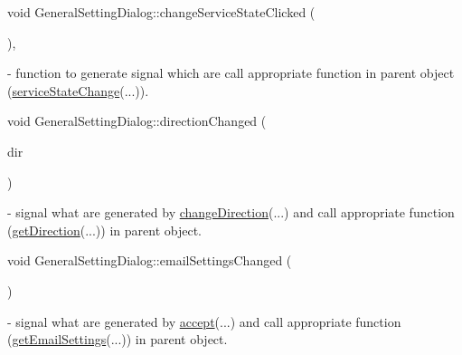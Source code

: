 \mbox{\label{classGeneralSettingDialog_ad5275b9ede5252e57d4b6a44eb771a04}} 
{\footnotesize\ttfamily void General\+Setting\+Dialog\+::\texorpdfstring{change\+Service\+State\+Clicked}{changeServiceStateClicked} (\begin{DoxyParamCaption}{ }\end{DoxyParamCaption}){\ttfamily [private]}, {\ttfamily [slot]}} - function to generate signal which are call appropriate function in parent object (\hyperlink{classMainWindow_a6390c39f77f17e86c59a4c8f8bf0e607}{service\+State\+Change}(...)).

\mbox{\label{classGeneralSettingDialog_aa4bc1d43246c829906a530b5a127a417}} 
{\footnotesize\ttfamily void General\+Setting\+Dialog\+::\texorpdfstring{direction\+Changed}{directionChanged} (\begin{DoxyParamCaption}\item[{int}]{dir }\end{DoxyParamCaption}){\ttfamily [signal]}} - signal what are generated by \hyperlink{classGeneralSettingDialog_a67274a86c828985ee88c055de4d2bce5}{change\+Direction}(...) and call appropriate function (\hyperlink{classMainWindow_a98097440e933cbc9a5080320e230c124}{get\+Direction}(...)) in parent object.

\mbox{\label{classGeneralSettingDialog_a825854c03817dfdb5b7c6185008ab620}} 
{\footnotesize\ttfamily void General\+Setting\+Dialog\+::\texorpdfstring{email\+Settings\+Changed}{emailSettingsChanged} (\begin{DoxyParamCaption}\item[{\mbox{\hyperlink{structEmailSettings}{Email\+Settings}}}]{ }\end{DoxyParamCaption}){\ttfamily [signal]}} - signal what are generated by \hyperlink{classGeneralSettingDialog_a8f189ce9494b6c5488f8a2be4c792f6a}{accept}(...) and call appropriate function (\hyperlink{classMainWindow_a5782e86aacd3c157412821fae13c85fb}{get\+Email\+Settings}(...)) in parent object.


